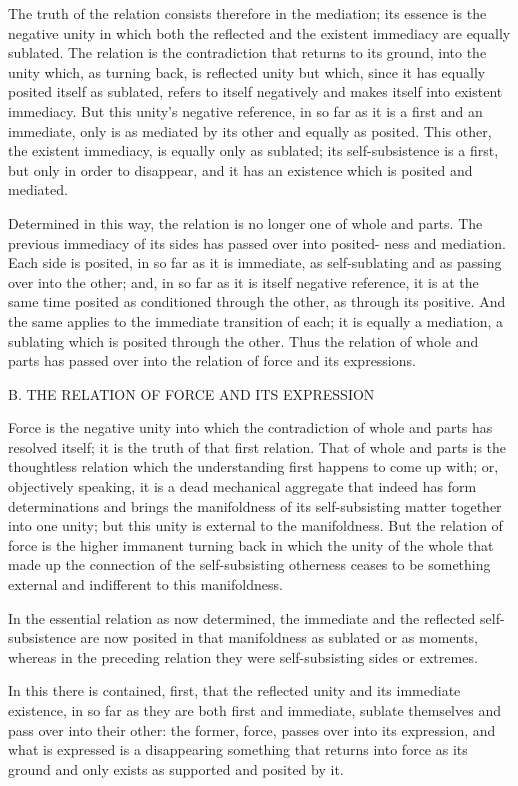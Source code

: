The truth of the relation consists therefore in the mediation; its essence is
the negative unity in which both the reflected and the existent immediacy
are equally sublated. The relation is the contradiction that returns to its
ground, into the unity which, as turning back, is reflected unity but which,
since it has equally posited itself as sublated, refers to itself negatively and
makes itself into existent immediacy. But this unity’s negative reference, in
so far as it is a first and an immediate, only is as mediated by its other and
equally as posited. This other, the existent immediacy, is equally only as
sublated; its self-subsistence is a first, but only in order to disappear, and it
has an existence which is posited and mediated.

Determined in this way, the relation is no longer one of whole and
parts. The previous immediacy of its sides has passed over into posited-
ness and mediation. Each side is posited, in so far as it is immediate, as
self-sublating and as passing over into the other; and, in so far as it is itself
negative reference, it is at the same time posited as conditioned through
the other, as through its positive. And the same applies to the immediate
transition of each; it is equally a mediation, a sublating which is posited
through the other.
Thus the relation of whole and parts has passed over
into the relation of force and its expressions.

B. THE RELATION OF FORCE AND ITS EXPRESSION

Force is the negative unity into which
the contradiction of whole and parts has resolved itself;
it is the truth of that first relation.
That of whole and parts is the thoughtless relation
which the understanding first happens to come up with;
or, objectively speaking, it is a dead mechanical aggregate
that indeed has form determinations
and brings the manifoldness of
its self-subsisting matter together into one unity;
but this unity is external to the manifoldness.
But the relation of force is the higher immanent turning back
in which the unity of the whole that made up the connection
of the self-subsisting otherness ceases to be something external
and indifferent to this manifoldness.

In the essential relation as now determined,
the immediate and the reflected self-subsistence are
now posited in that manifoldness as sublated or as moments,
whereas in the preceding relation they were self-subsisting
sides or extremes.

In this there is contained, first, that the reflected unity
and its immediate existence, in so far as they are both first and immediate,
sublate themselves and pass over into their other:
the former, force, passes over into its expression,
and what is expressed is a disappearing something
that returns into force as its ground
and only exists as supported and posited by it.

